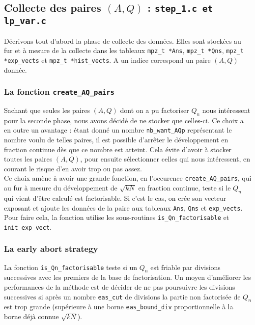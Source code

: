 \subsection{Collecte des paires $(A,Q)$ : \texttt{step\_1.c et lp\_var.c}}

Décrivons tout d'abord la phase de collecte des données. Elles sont
stockées au fur et à mesure de la collecte dans les tableaux \texttt{mpz\_t *Ans}, 
\texttt{mpz\_t *Qns}, \texttt{mpz\_t *exp\_vects} et \texttt{mpz\_t *hist\_vects}.
A un indice correspond un paire $(A,Q)$ donnée.\\ 

\subsubsection{La fonction \texttt{create\_AQ\_pairs}}

Sachant que seules les paires $(A,Q)$ dont on a pu factoriser $Q_n$ nous
intéressent pour la seconde phase, nous avons décidé de ne stocker que celles-ci.
Ce choix a en outre un avantage : étant donné un nombre \texttt{nb\_want\_AQp}
représentant le nombre voulu de telles paires, il est possible d'arrêter le 
développement en fraction continue dès que ce nombre est atteint. Cela évite
d'avoir à stocker toutes les paires $(A,Q)$, pour ensuite sélectionner celles 
qui nous intéressent, en courant le risque d'en avoir trop ou pas assez. \\

Ce choix amène à avoir une grande fonction, en l'occurence 
\texttt{create\_AQ\_pairs}, qui au fur à mesure du développement de $\sqrt{kN}$
en fraction continue, teste si le $Q_n$ qui vient d'être calculé est factorisable.
Si c'est le cas, on crée son vecteur exposant et ajoute les données de la paire
aux tableaux \texttt{Ans}, \texttt{Qns} et \texttt{exp\_vects}. Pour faire cela, la fonction
utilise les sous-routines \texttt{is\_Qn\_factorisable} et 
\texttt{init\_exp\_vect}.

\subsubsection{La \og early abort strategy \fg{}}

La fonction \texttt{is\_Qn\_factorisable} teste si un $Q_n$ est friable par 
divisions successives avec les premiers de la base de factorisation.  Un moyen 
d'améliorer les performances de la méthode est de décider de ne pas poursuivre
les divisions successives si après un nombre \texttt{eas\_cut} de divisions
la partie non factorisée de $Q_n$ est trop grande (supérieure à une borne 
\texttt{eas\_bound\_div} proportionnelle à la borne déjà connue $\sqrt{kN}$). 

